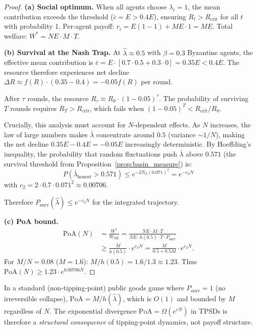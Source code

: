 \begin{proof}
\textbf{(a) Social optimum.}
When all agents choose $\lambda_i = 1$, the mean contribution
exceeds the threshold ($\bar{c} = E > 0.4E$), ensuring
$R_t > R_{\mathrm{crit}}$ for all $t$ with probability 1.
Per-agent payoff: $r_i = E(1-1) + ME \cdot 1 = ME$.
Total welfare: $W^* = NE \cdot M \cdot T$.

\textbf{(b) Survival at the Nash Trap.}
At $\hat{\lambda} \approx 0.5$ with $\beta = 0.3$ Byzantine agents,
the effective mean contribution is
$\bar{c} = E \cdot [0.7 \cdot 0.5 + 0.3 \cdot 0] = 0.35E < 0.4E$.
The resource therefore experiences net decline
$\Delta R \approx f(R) \cdot (0.35 - 0.4) = -0.05 f(R)$ per round.

After $\tau$ rounds, the resource $R_\tau \approx R_0 \cdot (1 - 0.05)^\tau$.
The probability of surviving $T$ rounds requires
$R_T > R_{\mathrm{crit}}$, which fails when
$(1 - 0.05)^T < R_{\mathrm{crit}} / R_0$.

Crucially, this analysis must account for $N$-dependent effects.
As $N$ increases, the law of large numbers makes
$\bar{\lambda}$ concentrate around $0.5$
(variance $\sim 1/N$), making the net decline
$0.35E - 0.4E = -0.05E$ increasingly deterministic.
By Hoeffding's inequality, the probability that
random fluctuations push $\bar{\lambda}$ above $0.571$
(the survival threshold from Proposition~\ref{prop:basin_measure}) is:
\[
  P(\bar{\lambda}_{\mathrm{honest}} > 0.571)
  \leq e^{-2 N_h (0.071)^2}
  = e^{-c_2 N}
\]
with $c_2 = 2 \cdot 0.7 \cdot 0.071^2 \approx 0.00706$.

Therefore $P_{\mathrm{surv}}(\hat{\lambda}) \leq e^{-c_2 N}$
for the integrated trajectory.

\textbf{(c) PoA bound.}
\begin{align*}
  \mathrm{PoA}(N)
  &= \frac{W^*}{W_{\mathrm{NE}}}
  = \frac{NE \cdot M \cdot T}{NE \cdot h(0.5) \cdot T
    \cdot P_{\mathrm{surv}}} \\
  &\geq \frac{M}{h(0.5)} \cdot e^{c_2 N}
  = \frac{M}{0.5 + 0.5M} \cdot e^{c_2 N}.
\end{align*}
For $M/N = 0.08$ ($M = 1.6$):
$M / h(0.5) = 1.6 / 1.3 \approx 1.23$.
Thus $\mathrm{PoA}(N) \geq 1.23 \cdot e^{0.00706 N}$.
\end{proof}

\begin{corollary}
\label{cor:poa_contrast}
In a standard (non-tipping-point) public goods game where
$P_{\mathrm{surv}} = 1$ (no irreversible collapse),
$\mathrm{PoA} = M / h(\hat{\lambda})$,
which is $O(1)$ and bounded by $M$
regardless of $N$.
The exponential divergence $\mathrm{PoA} = \Omega(e^{cN})$
in TPSDs is therefore a \emph{structural consequence}
of tipping-point dynamics, not payoff structure.
\end{corollary}

